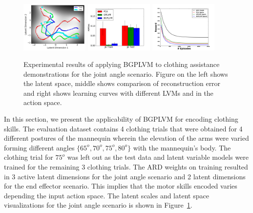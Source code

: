 \documentclass{article}
\begin{document}
\begin{figure}
  \centering
  \includegraphics[width=0.3\textwidth]{latentspace.png}
  \includegraphics[width=0.3\textwidth]{rmse.png}
  \includegraphics[width=0.3\textwidth]{rlcurve.png}
  \caption{Experimental results of applying BGPLVM to clothing assistance demonstrations for the joint angle scenario. Figure on the left shows the latent space, middle shows comparison of reconstruction error and right shows learning curves with different LVMs and in the action space.}
  \label{figure:results}
\end{figure}

In this section, we present the applicability of BGPLVM for encoding clothing skills. The evaluation dataset contains 4 clothing trials that were obtained for 4 different postures of the mannequin wherein the elevation of the arms were varied forming different angles $\{65^o, 70^o, 75^o, 80^o\}$ with the mannequin's body. The clothing trial for $75^o$ was left out as the test data and latent variable models were trained for the remaining 3 clothing trials. The ARD weights on training resulted in 3 active latent dimensions for the joint angle scenario and 2 latent dimensions for the end effector scenario. This implies that the motor skills encoded varies depending the input action space. The latent scales and latent space visualizations for the joint angle scenario is shown in Figure~\ref{figure:results}.
\end{document}
